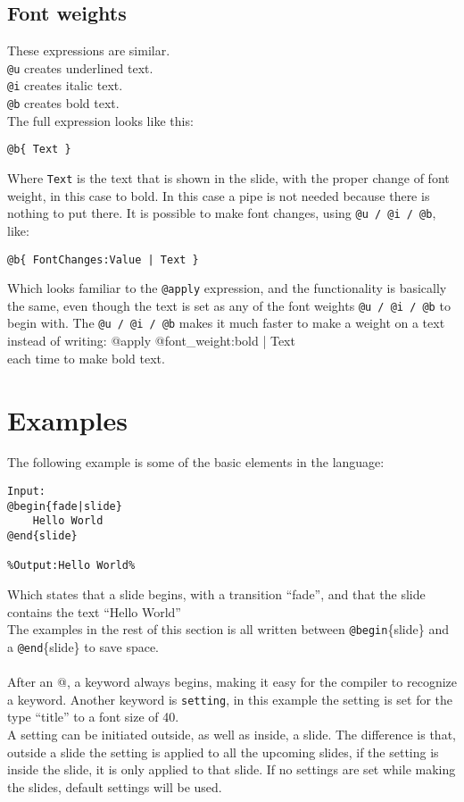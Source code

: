 \subsection{Font weights}
These expressions are similar. \\
\texttt{@u} creates underlined text. \\
\texttt{@i} creates italic text. \\
\texttt{@b} creates bold text. \\
The full expression looks like this:
\begin{lstlisting}[frame=single]
@b{ Text }
\end{lstlisting}
Where \texttt{Text} is the text that is shown in the slide, with the proper change of font weight, in this case to bold. In this case a pipe is not needed because there is nothing to put there. 
It is possible to make font changes, using \texttt{@u / @i / @b}, like:
 \begin{lstlisting}[frame=single]
@b{ FontChanges:Value | Text }
\end{lstlisting}
Which looks familiar to the \texttt{@apply} expression, and the functionality is basically the same, even though the text is set as any of the font weights \texttt{@u / @i / @b} to begin with. The \texttt{@u / @i / @b} makes it much faster to make a weight on a text instead of writing: @apply{ @font\_weight:bold | Text } \\
each time to make bold text.

\section{Examples}
The following example is some of the basic elements in the language:
\begin{lstlisting}[frame=single]
Input:
@begin{fade|slide}
    Hello World
@end{slide}

%Output:Hello World%
\end{lstlisting}

Which states that a slide begins, with a transition ``fade'', and that the slide contains the text ``Hello World'' \\
The examples in the rest of this section is all written between \texttt{@begin}\{slide\} and a \texttt{@end}\{slide\} to save space.
\\ \\
After an @, a keyword always begins, making it easy for the compiler to recognize a keyword.
Another keyword is \texttt{setting}, in this example the setting is set for the type ``title'' to a font size of 40. \\
A setting can be initiated outside, as well as inside, a slide. The difference is that, outside a slide the setting is applied to all the upcoming slides, if the setting is inside the slide, it is only applied to that slide. If no settings are set while making the slides, default settings will be used.

